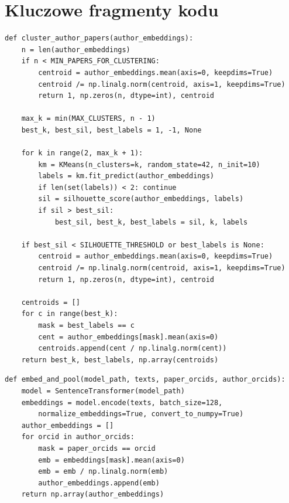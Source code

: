 \documentclass[a4paper,11pt]{article}
\begin{document}
\appendix
\section{Kluczowe fragmenty kodu}

\begin{lstlisting}[caption={\texttt{cluster\_author\_papers()} --- klasteryzacja prac autora.},label={lst:cluster}]
def cluster_author_papers(author_embeddings):
    n = len(author_embeddings)
    if n < MIN_PAPERS_FOR_CLUSTERING:
        centroid = author_embeddings.mean(axis=0, keepdims=True)
        centroid /= np.linalg.norm(centroid, axis=1, keepdims=True)
        return 1, np.zeros(n, dtype=int), centroid

    max_k = min(MAX_CLUSTERS, n - 1)
    best_k, best_sil, best_labels = 1, -1, None

    for k in range(2, max_k + 1):
        km = KMeans(n_clusters=k, random_state=42, n_init=10)
        labels = km.fit_predict(author_embeddings)
        if len(set(labels)) < 2: continue
        sil = silhouette_score(author_embeddings, labels)
        if sil > best_sil:
            best_sil, best_k, best_labels = sil, k, labels

    if best_sil < SILHOUETTE_THRESHOLD or best_labels is None:
        centroid = author_embeddings.mean(axis=0, keepdims=True)
        centroid /= np.linalg.norm(centroid, axis=1, keepdims=True)
        return 1, np.zeros(n, dtype=int), centroid

    centroids = []
    for c in range(best_k):
        mask = best_labels == c
        cent = author_embeddings[mask].mean(axis=0)
        centroids.append(cent / np.linalg.norm(cent))
    return best_k, best_labels, np.array(centroids)
\end{lstlisting}

\begin{lstlisting}[caption={\texttt{embed\_and\_pool()} --- mean pooling per autor.},label={lst:pool}]
def embed_and_pool(model_path, texts, paper_orcids, author_orcids):
    model = SentenceTransformer(model_path)
    embeddings = model.encode(texts, batch_size=128,
        normalize_embeddings=True, convert_to_numpy=True)
    author_embeddings = []
    for orcid in author_orcids:
        mask = paper_orcids == orcid
        emb = embeddings[mask].mean(axis=0)
        emb = emb / np.linalg.norm(emb)
        author_embeddings.append(emb)
    return np.array(author_embeddings)
\end{lstlisting}
\end{document}
